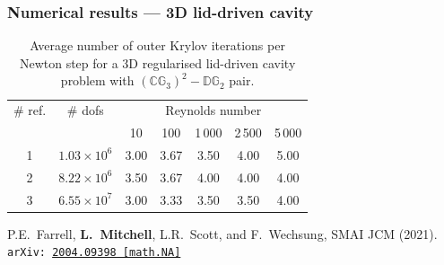 \documentclass[presentation,aspectratio=43, 10pt]{beamer}
\newcommand{\arxivlink}[2]{{\texttt{arXiv:\,\href{https://arxiv.org/abs/#1}{#1\,[#2]}}}}
\begin{document}
\begin{frame}
  \frametitle{Numerical results --- 3D lid-driven cavity}
  \begin{table}[htbp]
    \centering
    \begin{tabular}{cc|ccccc}
      \toprule
      \# ref. & \# dofs & \multicolumn{5}{c}{Reynolds number} \\
              && 10 & 100 & 1\,000 & 2\,500 & 5\,000 \\
      \midrule
      1   & $1.03\times 10^6$     & 3.00  & 3.67  & 3.50 & 4.00 & 5.00\\
      2   & $8.22\times 10^6$     & 3.50  & 3.67  & 4.00 & 4.00 & 4.00\\
      3   & $6.55\times 10^7$     & 3.00  & 3.33  & 3.50 & 3.50 & 4.00\\
      \bottomrule
    \end{tabular}
    \caption{Average number of outer Krylov iterations per Newton step for a
      3D regularised lid-driven cavity problem with
      $(\mathbb{CG}_3)^{2}-\mathbb{DG}_2$ pair.}
  \end{table}
  \begin{flushright}
    {\scriptsize
    P.E.~Farrell, \textbf{L.~Mitchell}, L.R.~Scott, and F.~Wechsung,
    SMAI JCM (2021).
    \arxivlink{2004.09398}{math.NA}\nocite{Farrell:2021a}
    }
  \end{flushright}
\end{frame}
\end{document}
